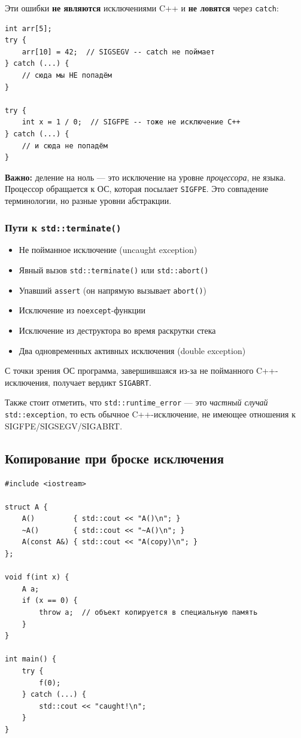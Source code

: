 \documentclass[a4paper,12pt]{article}
\begin{document}
\medskip
Эти ошибки \textbf{не являются} исключениями C++ и \textbf{не ловятся}
через \texttt{catch}:

\begin{lstlisting}
int arr[5];
try {
    arr[10] = 42;  // SIGSEGV -- catch не поймает
} catch (...) {
    // сюда мы НЕ попадём
}

try {
    int x = 1 / 0;  // SIGFPE -- тоже не исключение C++
} catch (...) {
    // и сюда не попадём
}
\end{lstlisting}

\textbf{Важно:} деление на ноль --- это исключение на уровне
\textit{процессора}, не языка. Процессор обращается к ОС, которая
посылает \texttt{SIGFPE}. Это совпадение терминологии, но разные
уровни абстракции.

\subsubsection{Пути к \texttt{std::terminate()}}

\begin{itemize}
    \item Не пойманное исключение (uncaught exception)
    \item Явный вызов \texttt{std::terminate()} или \texttt{std::abort()}
    \item Упавший \texttt{assert} (он напрямую вызывает \texttt{abort()})
    \item Исключение из \texttt{noexcept}-функции
    \item Исключение из деструктора во время раскрутки стека
    \item Два одновременных активных исключения (double exception)
\end{itemize}

С точки зрения ОС программа, завершившаяся из-за не пойманного C++-исключения,
получает вердикт \texttt{SIGABRT}.

Также стоит отметить, что \texttt{std::runtime\_error} ---
это \textit{частный случай} \texttt{std::exception}, то есть обычное
C++-исключение, не имеющее отношения к SIGFPE/SIGSEGV/SIGABRT.

\subsection{Копирование при броске исключения}

\begin{lstlisting}
#include <iostream>

struct A {
    A()         { std::cout << "A()\n"; }
    ~A()        { std::cout << "~A()\n"; }
    A(const A&) { std::cout << "A(copy)\n"; }
};

void f(int x) {
    A a;
    if (x == 0) {
        throw a;  // объект копируется в специальную память
    }
}

int main() {
    try {
        f(0);
    } catch (...) {
        std::cout << "caught!\n";
    }
}
\end{lstlisting}
\end{document}
